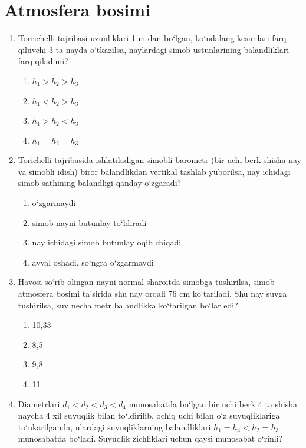 \section{Atmosfera bosimi}

\begin{enumerate}
\item Torrichelli tajribasi uzunliklari 1 m dan bo‘lgan, ko‘ndalang kesimlari 
farq qiluvchi 3 ta nayda o‘tkazilsa, naylardagi simob ustunlarining 
balandliklari farq qiladimi?

\begin{enumerate}[label=\Alph*)]
\item $h_1>h_2>h_3$
\item $h_1<h_2>h_3$
\item $h_1>h_2<h_3$
\item $h_1=h_2=h_3$
\end{enumerate}



\item Torichelli tajribasida ishlatiladigan simobli barometr 
(bir uchi berk shisha nay va simobli idish) biror balandlikdan 
vertikal tashlab yuborilsa, nay ichidagi simob sathining balandligi 
qanday o‘zgaradi?

\begin{enumerate}[label=\Alph*)]
\item o‘zgarmaydi
\item simob nayni butunlay to‘ldiradi
\item nay ichidagi simob butunlay oqib chiqadi
\item avval oshadi, so‘ngra o‘zgarmaydi
\end{enumerate}


\item Havosi so‘rib olingan nayni normal sharoitda simobga tushirilsa, 
simob atmosfera bosimi ta’sirida shu nay orqali 76 cm ko‘tariladi. 
Shu nay suvga tushirilsa, suv necha metr balandlikka ko‘tarilgan bo‘lar edi?

\begin{enumerate}[label=\Alph*)]
\item 10,33
\item 8,5
\item 9,8
\item 11
\end{enumerate}


\item Diametrlari $d_1<d_2<d_3<d_4$ munosabatda bo‘lgan bir uchi berk 
4 ta shisha naycha 4 xil suyuqlik bilan to‘ldirilib, ochiq uchi bilan 
o‘z suyuqliklariga to‘nkarilganda, ulardagi suyuqliklarning balandliklari 
$h_1=h_4<h_2=h_3$ munosabatda bo‘ladi. 
Suyuqlik zichliklari uchun qaysi munosabat o‘rinli?


\end{enumerate}
